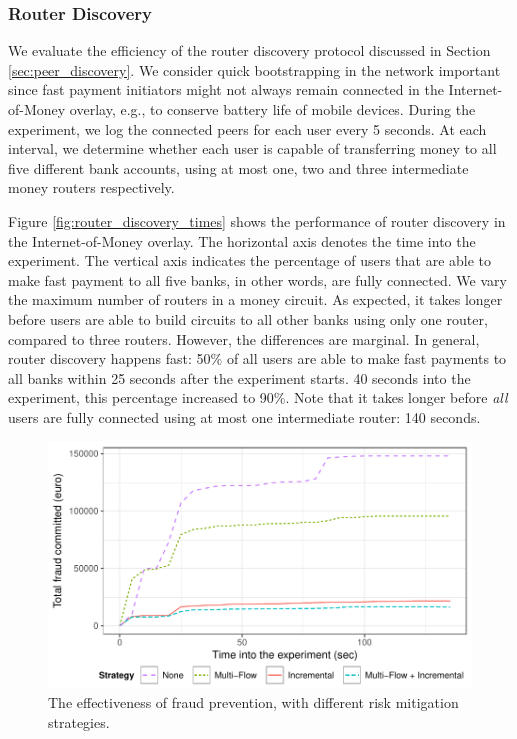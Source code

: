 \subsubsection*{Router Discovery}
\label{sec:router_discovery_evaluation}
We evaluate the efficiency of the router discovery protocol discussed in Section \ref{sec:peer_discovery}.
We consider quick bootstrapping in the network important since fast payment initiators might not always remain connected in the Internet-of-Money overlay, e.g., to conserve battery life of mobile devices.
During the experiment, we log the connected peers for each user every 5 seconds.
At each interval, we determine whether each user is capable of transferring money to all five different bank accounts, using at most one, two and three intermediate money routers respectively.

Figure \ref{fig:router_discovery_times} shows the performance of router discovery in the Internet-of-Money overlay.
The horizontal axis denotes the time into the experiment.
The vertical axis indicates the percentage of users that are able to make fast payment to all five banks, in other words, are fully connected.
We vary the maximum number of routers in a money circuit.
As expected, it takes longer before users are able to build circuits to all other banks using only one router, compared to three routers.
However, the differences are marginal.
In general, router discovery happens fast: 50\% of all users are able to make fast payments to all banks within 25 seconds after the experiment starts.
40 seconds into the experiment, this percentage increased to 90\%.
Note that it takes longer before \emph{all} users are fully connected using at most one intermediate router: 140 seconds.

\begin{figure}[!t]
	\centering
	\includegraphics[width=.8\linewidth]{iom/assets/fraud_experiment}
	\caption{The effectiveness of fraud prevention, with different risk mitigation strategies.}
	\label{fig:fraud_experiment}
\end{figure}

